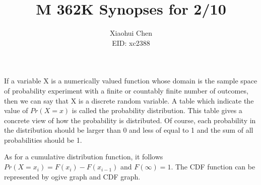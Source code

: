 \documentclass[12pt]{article}
\author{Xiaohui Chen \\EID: xc2388}
\title{M 362K Synopses for 2/10}
\begin{document}
\maketitle
\begin{spacing}{2.0}

If a variable X is a numerically valued function whose domain is the sample space of probability experiment with a finite or countably finite number of outcomes, then we can say that X is a discrete random variable. A table which indicate the value of $Pr(X=x)$ is called the probability distribution. This table gives a concrete view of how the probability is distributed. Of course, each probability in the distribution should be larger than 0 and less of equal to 1 and the sum of all probabilities should be 1.

As for a cumulative distribution function, it follows $Pr(X=x_i)= F(x_i)-F(x_{i-1})$ and $F(\infty)=1$. The CDF function can be represented by ogive graph and CDF graph. 



\end{spacing}
\end{document}

